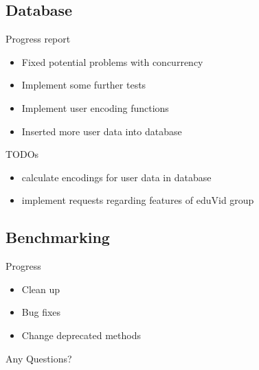 \documentclass[xcolor=x11names,table]{beamer}
\begin{document}
\subsection{Database}
\begin{frame}{Progress report}
\begin{itemize}
    \item Fixed potential problems with concurrency
    \item Implement some further tests
    \item Implement user encoding functions
    \item Inserted more user data into database
\end{itemize}
\end{frame}

\begin{frame}{TODOs}
\begin{itemize}
    \item calculate encodings for user data in database
    \item implement requests regarding features of eduVid group
\end{itemize}
\end{frame}

\subsection{Benchmarking}
\begin{frame}{Progress}
\begin{itemize}
    \item Clean up
    \item Bug fixes 
    \item Change deprecated methods
\end{itemize}
\end{frame}

\begin{frame}{Any Questions?}
\end{frame}
\end{document}
